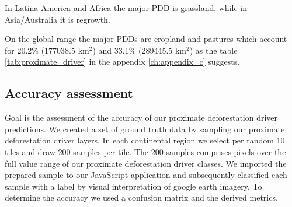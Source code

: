 			In Latina America and Africa the major \ac{PDD} is grassland, while in Asia/Australia it is regrowth. 

			On the global range the major \acp{PDD} are cropland and pastures which account for 20.2\% (177038.5 km$^2$) and 33.1\% (289445.5 km$^2$) as the table \ref{tab:proximate_driver} in the appendix \ref{ch:appendix_c} suggests. 

\clearpage

		\subsection{Accuracy assessment}
		\label{subsec:results_accuracy_assessment}
			 Goal is the assessment of the accuracy of our proximate deforestation driver predictions. We created a set of ground truth data by sampling our proximate deforestation driver layers. In each continental region we select per random 10 tiles and draw 200 samples per tile. The 200 samples comprises pixels over the full value range of our proximate deforestation driver classes. We imported the prepared sample to our JavaScript application and subsequently classified each sample with a label by visual interpretation of google earth imagery. To determine the accuracy we used a confusion matrix and the derived metrics.

